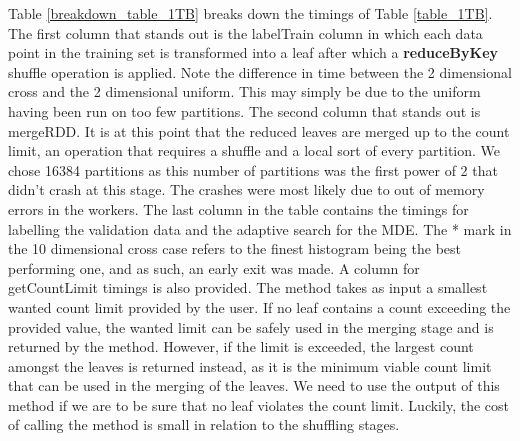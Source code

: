 \documentclass{report}
\begin{document}
Table \ref{breakdown_table_1TB} breaks down the timings of Table \ref{table_1TB}. The first column that stands out is the labelTrain column in which each data point in the training set is transformed into a leaf after which a \textbf{reduceByKey} shuffle operation is applied. Note the difference in time between the 2 dimensional cross and the 2 dimensional uniform. This may simply be due to the uniform
having been run on too few partitions. The second column that stands out is mergeRDD. It is at this point that the reduced leaves are merged up to the count limit, an operation that requires a shuffle and a local
sort of every partition. We chose 16384 partitions as this number of partitions was the first power of 2 that didn't crash at this stage. 
The crashes were most likely due to out of memory errors in the workers.
The last column in the table contains the timings for labelling the validation data and 
the adaptive search for the MDE. The * mark in the 10 dimensional cross case refers to the finest histogram  being the
best performing one, and as such, an early exit was made.
A column for getCountLimit timings is also provided. The method takes as input
a smallest wanted count limit provided by the user. If no leaf contains a count
exceeding the provided value, the wanted limit can be safely used in the merging
stage and is returned by the method. However, if the limit is exceeded, 
the largest count amongst the leaves is returned instead, as it is the minimum 
viable count limit that can be used in the merging of the leaves. We need to use
the output of this method if we are to be sure that no leaf violates the count limit.
Luckily, the cost of calling the method is small in relation to the shuffling stages.
\end{document}
